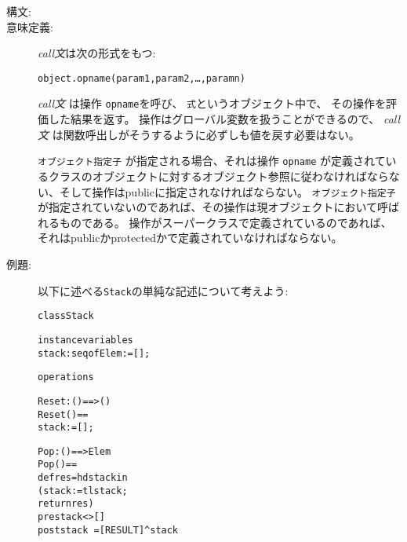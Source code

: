 \documentclass[\pformat,12pt]{jarticle}
\newcommand{\vppsmall}{\small\tt}
\begin{document}
\begin{description}
\item[構文:]



\item[意味定義:]  {\it call文}は次の形式をもつ:

  \begin{alltt}
    object.opname(param1, param2, \ldots, paramn)
  \end{alltt}

 {\it call文} は操作 {\tt opname}を呼び、 %
{\tt 式}というオブジェクト中で、
その操作を評価した結果を返す。
操作はグローバル変数を扱うことができるので、 {\it call文} は関数呼出しがそうするように必ずしも値を戻す必要はない。

 {\vppsmall オブジェクト指定子} が指定される場合、それは操作 {\tt opname} が定義されているクラスのオブジェクトに対するオブジェクト参照に従わなければならない、そして操作はpublicに指定されなければならない。
{\tt オブジェクト指定子}が指定されていないのであれば、その操作は現オブジェクトにおいて呼ばれるものである。
操作がスーパークラスで定義されているのであれば、それはpublicかprotectedかで定義されていなければならない。

\item[例題:] \mbox{} 

  以下に述べる{\tt Stack}の単純な記述について考えよう:

  \begin{alltt}
  class Stack

  instance variables
    stack: seq of Elem := [];

  operations

    \PUBLIC Reset: () ==> ()
    Reset() ==
      stack := []; 

    \PUBLIC Pop: () ==> Elem
    Pop() ==
      def res = hd stack in
       (stack := tl stack;
        return res)
    pre stack <> []
    post stack~ = [RESULT] ^ stack


\end{alltt}
\end{description}
\end{document}
